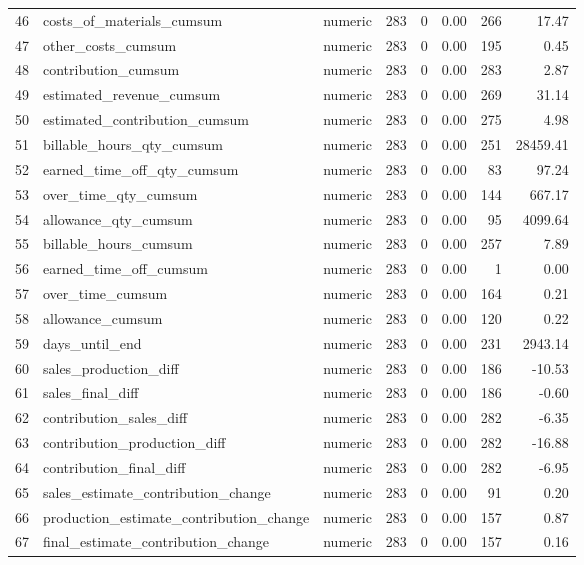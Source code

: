 \begin{sidewaystable}[ht]
\begin{tabular}{rllrrrrr}
  46 & costs\_of\_materials\_cumsum & numeric & 283 &   0 & 0.00 & 266 & 17.47 \\ 
  47 & other\_costs\_cumsum & numeric & 283 &   0 & 0.00 & 195 & 0.45 \\ 
  48 & contribution\_cumsum & numeric & 283 &   0 & 0.00 & 283 & 2.87 \\ 
  49 & estimated\_revenue\_cumsum & numeric & 283 &   0 & 0.00 & 269 & 31.14 \\ 
  50 & estimated\_contribution\_cumsum & numeric & 283 &   0 & 0.00 & 275 & 4.98 \\ 
  51 & billable\_hours\_qty\_cumsum & numeric & 283 &   0 & 0.00 & 251 & 28459.41 \\ 
  52 & earned\_time\_off\_qty\_cumsum & numeric & 283 &   0 & 0.00 &  83 & 97.24 \\ 
  53 & over\_time\_qty\_cumsum & numeric & 283 &   0 & 0.00 & 144 & 667.17 \\ 
  54 & allowance\_qty\_cumsum & numeric & 283 &   0 & 0.00 &  95 & 4099.64 \\ 
  55 & billable\_hours\_cumsum & numeric & 283 &   0 & 0.00 & 257 & 7.89 \\ 
  56 & earned\_time\_off\_cumsum & numeric & 283 &   0 & 0.00 &   1 & 0.00 \\ 
  57 & over\_time\_cumsum & numeric & 283 &   0 & 0.00 & 164 & 0.21 \\ 
  58 & allowance\_cumsum & numeric & 283 &   0 & 0.00 & 120 & 0.22 \\ 
  59 & days\_until\_end & numeric & 283 &   0 & 0.00 & 231 & 2943.14 \\ 
  60 & sales\_production\_diff & numeric & 283 &   0 & 0.00 & 186 & -10.53 \\ 
  61 & sales\_final\_diff & numeric & 283 &   0 & 0.00 & 186 & -0.60 \\ 
  62 & contribution\_sales\_diff & numeric & 283 &   0 & 0.00 & 282 & -6.35 \\ 
  63 & contribution\_production\_diff & numeric & 283 &   0 & 0.00 & 282 & -16.88 \\ 
  64 & contribution\_final\_diff & numeric & 283 &   0 & 0.00 & 282 & -6.95 \\ 
  65 & sales\_estimate\_contribution\_change & numeric & 283 &   0 & 0.00 &  91 & 0.20 \\ 
  66 & production\_estimate\_contribution\_change & numeric & 283 &   0 & 0.00 & 157 & 0.87 \\ 
  67 & final\_estimate\_contribution\_change & numeric & 283 &   0 & 0.00 & 157 & 0.16 \\ 

\end{tabular}
\end{sidewaystable}
